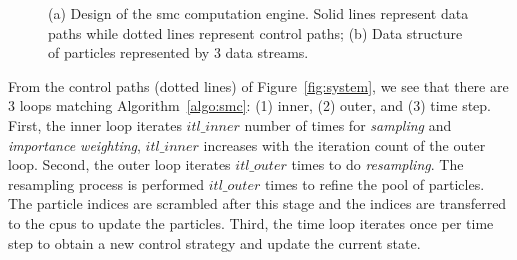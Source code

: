 \setcounter{subfigure}{0}
\begin{figure}[t!]
\centering
{}
\caption{(a) Design of the \gls{smc} computation engine. Solid lines represent data paths while dotted lines represent control paths; (b) Data structure of particles represented by 3 data streams.}
\end{figure}

From the control paths (dotted lines) of Figure~\ref{fig:system}, we see that there are 3 loops matching Algorithm~\ref{algo:smc}: 
(1) inner, (2) outer, and (3) time step.
First, the inner loop iterates $itl\_inner$ number of times for \textit{sampling} and \textit{importance weighting},
$itl\_inner$ increases with the iteration count of the outer loop.
Second, the outer loop iterates $itl\_outer$ times to do \textit{resampling}.
The resampling process is performed $itl\_outer$ times to refine the pool of particles.
The particle indices are scrambled after this stage and the indices are transferred to the \gls{cpu}s to update the particles.
Third, the time loop iterates once per time step to obtain a new control strategy and update the current state.

